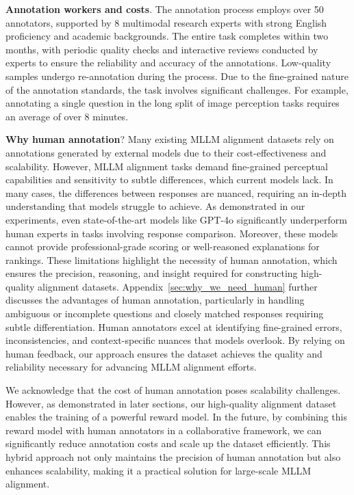 \textbf{Annotation workers and costs}. The annotation process employs over 50 annotators, supported by 8 multimodal research experts with strong English proficiency and academic backgrounds. The entire task completes within two months, with periodic quality checks and interactive reviews conducted by experts to ensure the reliability and accuracy of the annotations. Low-quality samples undergo re-annotation during the process. Due to the fine-grained nature of the annotation standards, the task involves significant challenges. For example, annotating a single question in the long split of image perception tasks requires an average of over $8$ minutes.


\textbf{Why human annotation}? Many existing MLLM alignment datasets rely on annotations generated by external models due to their cost-effectiveness and scalability. However, MLLM alignment tasks demand fine-grained perceptual capabilities and sensitivity to subtle differences, which current models lack. In many cases, the differences between responses are nuanced, requiring an in-depth understanding that models struggle to achieve. As demonstrated in our experiments, even state-of-the-art models like GPT-4o significantly underperform human experts in tasks involving response comparison. Moreover, these models cannot provide professional-grade scoring or well-reasoned explanations for rankings. These limitations highlight the necessity of human annotation, which ensures the precision, reasoning, and insight required for constructing high-quality alignment datasets. Appendix~\ref{sec:why_we_need_human} further discusses the advantages of human annotation, particularly in handling ambiguous or incomplete questions and closely matched responses requiring subtle differentiation. Human annotators excel at identifying fine-grained errors, inconsistencies, and context-specific nuances that models overlook. By relying on human feedback, our approach ensures the dataset achieves the quality and reliability necessary for advancing MLLM alignment efforts.

We acknowledge that the cost of human annotation poses scalability challenges. However, as demonstrated in later sections, our high-quality alignment dataset enables the training of a powerful reward model. In the future, by combining this reward model with human annotators in a collaborative framework, we can significantly reduce annotation costs and scale up the dataset efficiently. This hybrid approach not only maintains the precision of human annotation but also enhances scalability, making it a practical solution for large-scale MLLM alignment.


